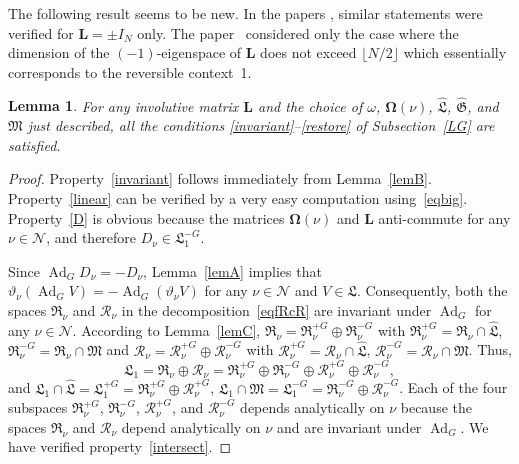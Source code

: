 \documentclass[12pt,reqno]{amsart}
\newtheorem{lem}{Lemma} \newtheorem{thm}{Theorem}
\theoremstyle{definition}
\begin{document}
The following result seems to be new. In the papers \cite{M67,S11}, similar
statements were verified for ${\mathbf L}=\pm I_N$ only. The paper~\cite{Sch87}
considered only the case where the dimension of the $(-1)$-eigenspace of ${\mathbf L}$
does not exceed $\lfloor N/2\rfloor$ which essentially corresponds to the
reversible context~1.

\begin{lem}\label{lemcent}
For \emph{any} involutive matrix ${\mathbf L}$ and the choice of $\omega$,
${\mathbf{\Omega}}(\nu)$, ${\widehat{\mathfrak L}}$, ${\widehat{\mathfrak G}}$, and ${\mathfrak M}$ just described, all the conditions
\textup{\mbox{\ref{invariant}--\ref{restore}}} of Subsection~\ref{LG} are
satisfied.
\end{lem}

\begin{proof}
Property~\ref{invariant} follows immediately from Lemma~\ref{lemB}.
Property~\ref{linear} can be verified by a very easy computation
using~\eqref{eqbig}. Property~\ref{D} is obvious because the matrices
${\mathbf{\Omega}}(\nu)$ and ${\mathbf L}$ anti-commute for any $\nu\in{\mathcal N}$, and therefore
$D_\nu\in{\mathfrak L}_1^{-G}$.

Since $\operatorname{Ad}_GD_\nu=-D_\nu$, Lemma~\ref{lemA} implies that
${\vartheta}_\nu(\operatorname{Ad}_GV)=-\operatorname{Ad}_G({\vartheta}_\nu V)$ for any $\nu\in{\mathcal N}$ and $V\in{\mathfrak L}$.
Consequently, both the spaces ${\mathfrak R}_\nu$ and ${\mathcal R}_\nu$ in the
decomposition~\eqref{eqfRcR} are invariant under $\operatorname{Ad}_G$ for any $\nu\in{\mathcal N}$.
According to Lemma~\ref{lemC}, ${\mathfrak R}_\nu={\mathfrak R}_\nu^{+G}\oplus{\mathfrak R}_\nu^{-G}$ with
${\mathfrak R}_\nu^{+G}={\mathfrak R}_\nu\cap{\widehat{\mathfrak L}}$, ${\mathfrak R}_\nu^{-G}={\mathfrak R}_\nu\cap{\mathfrak M}$ and
${\mathcal R}_\nu={\mathcal R}_\nu^{+G}\oplus{\mathcal R}_\nu^{-G}$ with ${\mathcal R}_\nu^{+G}={\mathcal R}_\nu\cap{\widehat{\mathfrak L}}$,
${\mathcal R}_\nu^{-G}={\mathcal R}_\nu\cap{\mathfrak M}$. Thus,
\[
{\mathfrak L}_1={\mathfrak R}_\nu\oplus{\mathcal R}_\nu =
{\mathfrak R}_\nu^{+G}\oplus{\mathfrak R}_\nu^{-G} \oplus {\mathcal R}_\nu^{+G}\oplus{\mathcal R}_\nu^{-G},
\]
and ${\mathfrak L}_1\cap{\widehat{\mathfrak L}}={\mathfrak L}_1^{+G}={\mathfrak R}_\nu^{+G}\oplus{\mathcal R}_\nu^{+G}$,
${\mathfrak L}_1\cap{\mathfrak M}={\mathfrak L}_1^{-G}={\mathfrak R}_\nu^{-G}\oplus{\mathcal R}_\nu^{-G}$. Each of the four
subspaces ${\mathfrak R}_\nu^{+G}$, ${\mathfrak R}_\nu^{-G}$, ${\mathcal R}_\nu^{+G}$, and ${\mathcal R}_\nu^{-G}$
depends analytically on $\nu$ because the spaces ${\mathfrak R}_\nu$ and ${\mathcal R}_\nu$
depend analytically on $\nu$ and are invariant under $\operatorname{Ad}_G$. We have verified
property~\ref{intersect}.


\end{proof}
\end{document}
